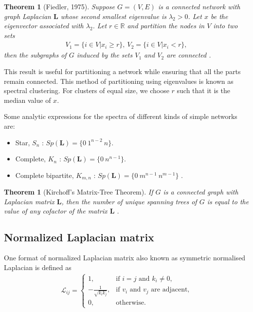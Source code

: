 \documentclass[10pt,a4paper]{article}
\theoremstyle{plain}
\newtheorem{thm}[subsection]{Theorem}
\theoremstyle{definition}
\begin{document}
\begin{thm}[Fiedler, 1975]
	Suppose $G = (V,E)$ is a connected network with graph Laplacian $\mathbf{L}$ whose second smallest eigenvalue is $\lambda_2 > 0$. Let $x$ be the eigenvector associated with $\lambda_2$. Let $r \in \mathbb{R}$ and partition the nodes in $V$ into two sets
	\begin{eqnarray}
	V_1 = \{i \in V|x_i \geq r\}, ~ V_2 = \{i \in V | x_i < r\}, 
	\end{eqnarray}
	then the subgraphs of $G$ induced by the sets $V_1$ and $V_2$ are connected \citep{estrada2015first}.
	\label{fiedler}
\end{thm}
This result is useful for partitioning a network while ensuring that all the parts remain connected. This method of partitioning using eigenvalues is known as spectral clustering. For clusters of equal size, we choose $r$ such that it is the median value of $x$. 


Some analytic expressions for the spectra of different kinds of simple networks are:
\begin{itemize}
	\item Star, $S_n$ : $Sp(\mathbf{L}) = \{ 0~ 1^{n-2}~n\}$. 
	
	\item Complete, $K_n$ : $Sp(\mathbf{L}) = \{ 0~ n^{n-1} \}$. 
	
	\item Complete bipartite, $K_{m,n}$ : $Sp(\mathbf{L}) =\{ 0 ~ m^{n-1} ~ n^{m-1}\}$ \citep{estrada2011structure}.
	
\end{itemize}

\begin{thm}[Kirchoff's Matrix-Tree Theorem]
	If $G$ is a connected graph with Laplacian matrix $\mathbf{L}$, then the number of unique spanning trees of $G$ is equal to the value of any cofactor of the matrix $\mathbf{L}$ \citep{harris2008combinatorics}.
	\label{thm:kirchoff}
\end{thm}

\subsection{Normalized Laplacian matrix}
One format of normalized Laplacian matrix also known as symmetric normalised Laplacian is defined as 
\begin{eqnarray*}
	\mathcal{L}_{ij} = \begin{cases} 1, &\mbox{if } i = j \text{ and } k_i \neq  0, \\
		- \frac{1}{\sqrt{k_i k_j}}, &\mbox{if } v_i \text{ and } v_j \text{ are adjacent,} \\ 
		0, & \text{otherwise}.
	\end{cases}
\end{eqnarray*}
\end{document}
